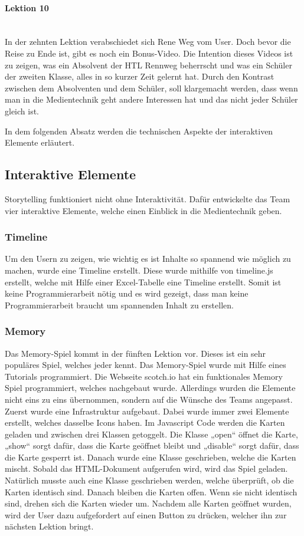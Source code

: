 \paragraph{Lektion 10}
\leavevmode \\
In der zehnten Lektion verabschiedet sich Rene Weg vom User. Doch bevor die Reise zu Ende ist, gibt es noch ein Bonus-Video. Die Intention dieses Videos ist zu zeigen, was ein Absolvent der HTL Rennweg beherrscht und was ein Schüler der zweiten Klasse, alles in so kurzer Zeit gelernt hat. Durch den Kontrast zwischen dem Absolventen und dem Schüler, soll klargemacht werden, dass wenn man in die Medientechnik geht andere Interessen hat und das nicht jeder Schüler gleich ist.

In dem folgenden Absatz werden die technischen Aspekte der interaktiven Elemente erläutert.


\subsection{Interaktive Elemente}

Storytelling funktioniert nicht ohne Interaktivität.  Dafür entwickelte das Team vier interaktive Elemente, welche einen Einblick in die Medientechnik geben. 
\subsubsection{Timeline}
Um den Usern zu zeigen, wie wichtig es ist Inhalte so spannend wie möglich zu machen, wurde eine Timeline erstellt. Diese wurde mithilfe von timeline.js erstellt, welche mit Hilfe einer Excel-Tabelle eine Timeline erstellt. Somit ist keine Programmierarbeit nötig und es wird gezeigt, dass man keine Programmierarbeit braucht um spannenden Inhalt zu erstellen.
\subsubsection{Memory}
Das Memory-Spiel kommt in der fünften Lektion vor. Dieses ist ein sehr populäres Spiel, welches jeder kennt. Das Memory-Spiel wurde mit Hilfe eines Tutorials programmiert. Die Webseite scotch.io  hat ein funktionales Memory Spiel programmiert, welches nachgebaut wurde. Allerdings wurden die Elemente nicht eins zu eins übernommen, sondern auf die Wünsche des Teams angepasst. Zuerst wurde eine Infrastruktur aufgebaut. Dabei wurde immer zwei Elemente erstellt, welches dasselbe Icons haben. Im Javascript Code werden die Karten geladen und zwischen drei Klassen getoggelt. Die Klasse „open“ öffnet die Karte, „show“ sorgt dafür, dass die Karte geöffnet bleibt und „disable“ sorgt dafür, dass die Karte gesperrt ist. Danach wurde eine Klasse geschrieben, welche die Karten mischt. Sobald das HTML-Dokument aufgerufen wird, wird das Spiel geladen. Natürlich musste auch eine Klasse geschrieben werden, welche überprüft, ob die Karten identisch sind. Danach bleiben die Karten offen. Wenn sie nicht identisch sind, drehen sich die Karten wieder um. Nachdem alle Karten geöffnet wurden, wird der User dazu aufgefordert auf einen Button zu drücken, welcher ihn zur nächsten Lektion bringt. 

